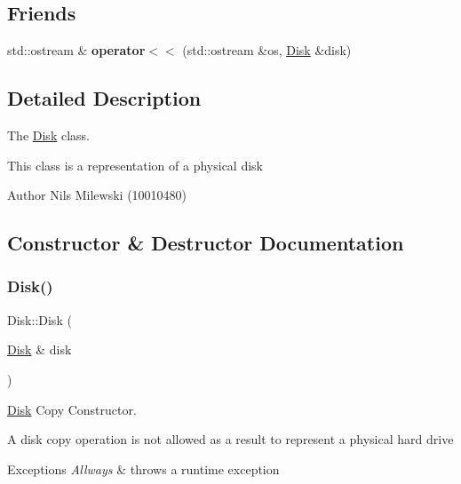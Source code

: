 \subsection*{Friends}
\begin{DoxyCompactItemize}
\item 
\mbox{\label{classcore_1_1disk_1_1_disk_ab1a95b006b3b89b708da1cd417d1d96d}} 
std\+::ostream \& {\bfseries operator$<$$<$} (std\+::ostream \&os, \mbox{\hyperlink{classcore_1_1disk_1_1_disk}{Disk}} \&disk)
\end{DoxyCompactItemize}


\subsection{Detailed Description}
The \mbox{\hyperlink{classcore_1_1disk_1_1_disk}{Disk}} class. 

This class is a representation of a physical disk \begin{DoxyAuthor}{Author}
Nils Milewski (10010480) 
\end{DoxyAuthor}


\subsection{Constructor \& Destructor Documentation}
\mbox{\label{classcore_1_1disk_1_1_disk_ad1fec93b14401a2496053fee61ec093e}} 
\subsubsection{\texorpdfstring{Disk()}{Disk()}\hspace{0.1cm}{\footnotesize\ttfamily [1/4]}}
{\footnotesize\ttfamily Disk\+::\+Disk (\begin{DoxyParamCaption}\item[{\mbox{\hyperlink{classcore_1_1disk_1_1_disk}{Disk}} \&}]{disk }\end{DoxyParamCaption})\hspace{0.3cm}{\ttfamily [private]}}



\mbox{\hyperlink{classcore_1_1disk_1_1_disk}{Disk}} Copy Constructor. 

A disk copy operation is not allowed as a result to represent a physical hard drive 
\begin{DoxyExceptions}{Exceptions}
{\em Allways} & throws a runtime exception \\
\hline
\end{DoxyExceptions}
\mbox{\label{classcore_1_1disk_1_1_disk_a2c193c2ef0c575fe9ffa77eb2f7cf5ef}} 
